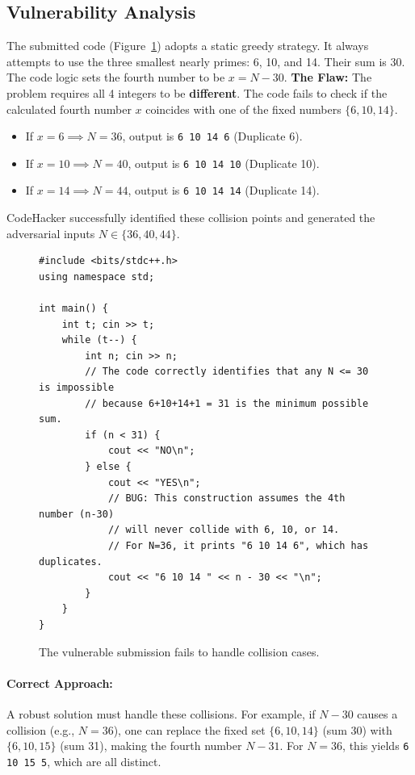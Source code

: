\documentclass[11pt]{article}
\begin{document}
\subsection{Vulnerability Analysis}
The submitted code (Figure~\ref{fig:logic-fail}) adopts a static greedy strategy. It always attempts to use the three smallest nearly primes: 6, 10, and 14. Their sum is $30$.
The code logic sets the fourth number to be $x = N - 30$.
\newline
\textbf{The Flaw:} The problem requires all 4 integers to be \textbf{different}. The code fails to check if the calculated fourth number $x$ coincides with one of the fixed numbers $\{6, 10, 14\}$.
\begin{itemize}
    \item If $x = 6 \implies N = 36$, output is \texttt{6 10 14 6} (Duplicate 6).
    \item If $x = 10 \implies N = 40$, output is \texttt{6 10 14 10} (Duplicate 10).
    \item If $x = 14 \implies N = 44$, output is \texttt{6 10 14 14} (Duplicate 14).
\end{itemize}
CodeHacker successfully identified these collision points and generated the adversarial inputs $N \in \{36, 40, 44\}$.

\begin{figure}[h]
\centering
\begin{minipage}{0.95\textwidth}
\begin{lstlisting}[style=cppstyle]
#include <bits/stdc++.h>
using namespace std;

int main() {
    int t; cin >> t;
    while (t--) {
        int n; cin >> n;
        // The code correctly identifies that any N <= 30 is impossible
        // because 6+10+14+1 = 31 is the minimum possible sum.
        if (n < 31) {
            cout << "NO\n";
        } else {
            cout << "YES\n";
            // BUG: This construction assumes the 4th number (n-30)
            // will never collide with 6, 10, or 14.
            // For N=36, it prints "6 10 14 6", which has duplicates.
            cout << "6 10 14 " << n - 30 << "\n";
        }
    }
}
\end{lstlisting}
\end{minipage}
\caption{The vulnerable submission fails to handle collision cases.}
\label{fig:logic-fail}
\end{figure}

\paragraph{Correct Approach:}
A robust solution must handle these collisions. For example, if $N-30$ causes a collision (e.g., $N=36$), one can replace the fixed set $\{6, 10, 14\}$ (sum 30) with $\{6, 10, 15\}$ (sum 31), making the fourth number $N-31$. For $N=36$, this yields \texttt{6 10 15 5}, which are all distinct.
\end{document}
